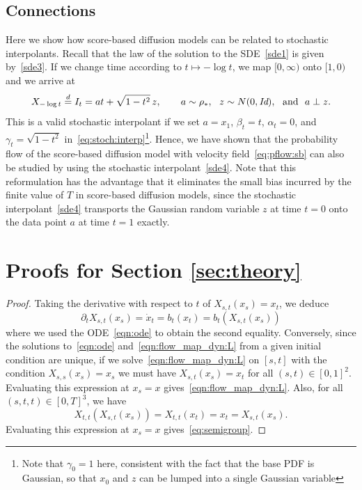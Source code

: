 \subsection{Connections}
\label{app:connect}

Here we show how score-based diffusion models can be related to stochastic interpolants.
%
Recall that the law of the solution to the SDE~\eqref{sde1} is given by~\eqref{sde3}.
%
If we change time according to $t \mapsto - \log t$, we map $[0,\infty)$ onto $[1,0)$ and we arrive at
\begin{equation}
	X_{-\log t} \stackrel{d}{=} I_t =  a t+\sqrt{1-t^2} \, z, \qquad  a\sim \rho_*, \ \  z\sim  N(0,\Id), \ \text{ and } \ a\perp z.
	\label{sde4}
\end{equation}
This is a valid stochastic interpolant if we set $a=x_1$, $\beta_t=t$, $\alpha_t = 0$, and $\gamma_t = \sqrt{1-t^2} $ in~\eqref{eq:stoch:interp}\footnote{Note that $\gamma_0 =1$ here, consistent with the fact that the base PDF is Gaussian, so that $x_0$ and $z$ can be lumped into a single Gaussian variable}.
%
Hence, we have shown that the probability flow of the score-based diffusion model with velocity field~\eqref{eq:pflow:sb} can also be studied by using the stochastic interpolant~\eqref{sde4}.
%
Note that this reformulation has the advantage that it eliminates the small bias incurred by the finite value of $T$ in score-based diffusion models, since the stochastic interpolant~\eqref{sde4} transports the Gaussian random variable $z$ at  time $t=0$ onto the data point $a$ at time $t=1$ exactly.


\section{Proofs for Section \ref{sec:theory}}
\label{app:theory}




\flowmap*
\begin{proof}
	Taking the derivative with respect to $t$ of $X_{s,t}(x_s) = x_t$, we deduce
	\begin{equation}
		\label{eq:Lag:1}
		\partial_t X_{s,t}(x_s) = \dot x_t = b_t(x_t) = b_t(X_{s,t}(x_s))
	\end{equation}
	where we used the ODE~\eqref{eqn:ode} to obtain the second equality.
	Conversely, since the solutions to~\eqref{eqn:ode} and~\eqref{eqn:flow_map_dyn:L} from a given initial condition are unique, if we solve~\cref{eqn:flow_map_dyn:L} on $[s,t]$ with the condition $X_{s,s}(x_s)=x_s$ we must have $X_{s,t}(x_s) = x_t$ for all $(s,t)\in[0,1]^2$. Evaluating this expression at $x_s=x$ gives~\eqref{eqn:flow_map_dyn:L}. Also, for all $(s,t,t)\in [0,T]^3$, we have
	\begin{equation}
		\label{eq:Lag:2}
		X_{t,t}(X_{s,t}(x_s)) =X_{t,t}(x_t) = x_t = X_{s,t}(x_s).
	\end{equation}
	Evaluating this expression at $x_s=x$ gives~\eqref{eq:semigroup}.
\end{proof}

